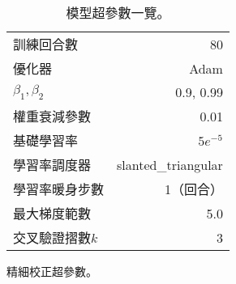 \begin{table}[htbp]
\begin{subtable}[t]{.4\textwidth}
\begin{tabular}[t]{@{}lr@{}}
            訓練回合數          & 80 \\
            優化器              & Adam \\
            $\beta_1,\beta_2$  & 0.9, 0.99 \\
            權重衰減參數         & 0.01 \\
            基礎學習率          & $5e^{-5}$ \\
            學習率調度器        & slanted\_triangular \\
            學習率暖身步數       & 1（回合）\\
            最大梯度範數        & 5.0 \\
            交叉驗證摺數$k$     & 3   \\
        \bottomrule
        \end{tabular}
        \caption{
            精細校正超參數。
        }
        \label{tab:finetune_hparams}
    \end{subtable}
    \caption{
        模型超參數一覽。
    }
    \label{tab:hparams}
\end{table}